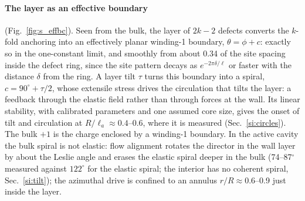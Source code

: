 \documentclass[aps,prl,onecolumn,superscriptaddress,amsmath,amssymb,nofootinbib]{revtex4-2}
\newcommand{\la}{\ell_a}
\begin{document}
\paragraph{The layer as an effective boundary} (Fig.~\ref{fig:s_effbc}). Seen from the bulk, the layer of $2k-2$ defects converts the $k$-fold anchoring into an effectively planar
winding-1 boundary, $\theta=\phi+c$: exactly so in the one-constant limit, and smoothly from about 0.34 of the site spacing inside the defect ring, since the site pattern decays
as $e^{-2\pi\delta/\ell}$ or faster with the distance $\delta$ from the ring. A layer tilt $\tau$ turns this boundary into a spiral, $c=90^\circ+\tau/2$, whose extensile stress drives
the circulation that tilts the layer: a feedback through the elastic field rather than through forces at the wall. Its linear stability, with calibrated parameters and one assumed
core size, gives the onset of tilt and circulation at $R/\la\approx0.4$--0.6, where it is measured (Sec.~\ref{si:circles}). The bulk $+1$ is the charge enclosed by a winding-1
boundary. In the active cavity the bulk spiral is not elastic: flow alignment rotates the director in the wall layer by about the Leslie angle and erases the elastic spiral deeper in
the bulk (74--87$^\circ$ measured against $122^\circ$ for the elastic spiral; the interior has no coherent spiral, Sec.~\ref{si:tilt}); the azimuthal drive is confined to an annulus $r/R\approx0.6$--0.9 just
inside the layer.
\end{document}
